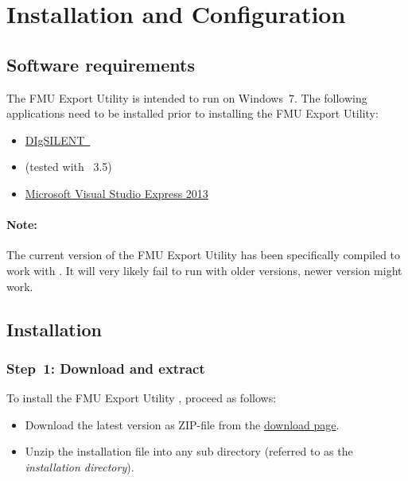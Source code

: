 
\chapter{Installation and Configuration}

\section{Software requirements}

The \fmipp \pf FMU Export Utility is intended to run on Windows~7. The following applications need to be installed prior to installing the \fmipp \pf FMU Export Utility:
\begin{itemize}
  \item \href{http://www.digsilent.com/}{DIgSILENT~\pfversion}
  \item \href{https://www.python.org/}{\python} (tested with \python~3.5)
  \item \href{https://www.visualstudio.com/vs/older-downloads/}{Microsoft Visual Studio Express 2013}
\end{itemize}

\subsubsection*{Note:}
The current version of the \fmipp \pf FMU Export Utility has been specifically compiled to work with \pfversion.
It will very likely fail to run with older versions, newer version might work.


\section{Installation}
\label{sec:install}

\subsection*{Step~1: Download and extract}

To install the \fmipp \pf FMU Export Utility , proceed as follows:
\begin{itemize}
  \item Download the latest version as ZIP-file from the \href{http://sourceforge.net/projects/powerfactory-fmu/files/latest/download}{download page}.
  \item Unzip the installation file into any sub directory (referred to as the \emph{installation directory}).
\end{itemize}

